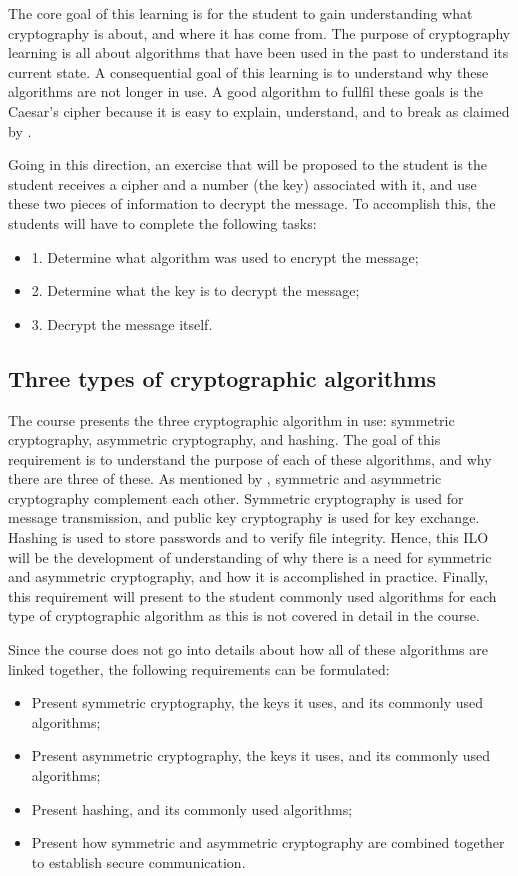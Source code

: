 \documentclass{l4proj}
\begin{document}
The core goal of this learning is for the student to gain understanding what cryptography is about, and where it has come from.
The purpose of cryptography learning is all about algorithms that have been used in the past to understand its current state.
A consequential goal of this learning is to understand why these algorithms are not longer in use.
A good algorithm to fullfil these goals is the Caesar's cipher because it is easy to explain, 
understand, and to break as claimed by \citet{anderson_security_2008}.

Going in this direction, an exercise that will be proposed to the student is
the student receives a cipher and a number (the key) associated with it, and use these two pieces of information to decrypt the message.
To accomplish this, the students will have to complete the following tasks:
\begin{itemize}
    \item 1. Determine what algorithm was used to encrypt the message;
    \item 2. Determine what the key is to decrypt the message;
    \item 3. Decrypt the message itself.
\end{itemize}

\subsection{Three types of cryptographic algorithms}

The course presents the three cryptographic algorithm in use: symmetric cryptography,
asymmetric cryptography, and hashing. 
The goal of this requirement is to understand the purpose of each of these algorithms,
and why there are three of these. As mentioned by \citet{kessler_overview_2016},
symmetric and asymmetric cryptography complement each other. 
Symmetric cryptography is used for message transmission, and public key cryptography 
is used for key exchange. Hashing is used to store passwords and to verify file integrity.
Hence, this ILO will be the development of understanding of why there is a need for symmetric and asymmetric
cryptography, and how it is accomplished in practice.
Finally, this requirement will present to the student commonly used algorithms for each
type of cryptographic algorithm as this is not covered in detail in the course.

Since the course does not go into details about how all of these algorithms are 
linked together, the following requirements can be formulated:
\begin{itemize}
    \item Present symmetric cryptography, the keys it uses, and its commonly used algorithms;
    \item Present asymmetric cryptography, the keys it uses, and its commonly used algorithms;
    \item Present hashing, and its commonly used algorithms;
    \item Present how symmetric and asymmetric cryptography are combined together
    to establish secure communication.
\end{itemize}
\end{document}
